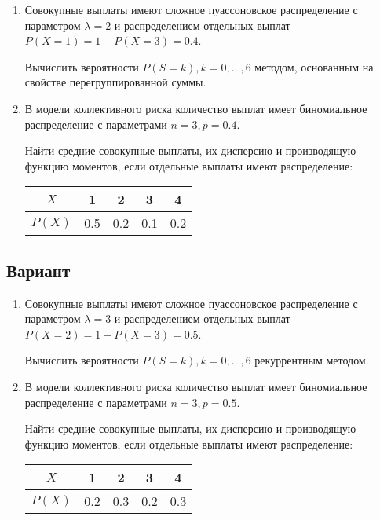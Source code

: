\documentclass[14pt, a4paper]{article}
\begin{document}
	\begin{enumerate}
		\item 
		Совокупные выплаты имеют сложное пуассоновское распределение с параметром $\lambda = 2$ и распределением отдельных выплат $P(X=1) = 1 - P(X=3) = 0.4$.
		
		Вычислить вероятности $P(S=k), k = 0, ..., 6$ методом, основанным на свойстве перегруппированной суммы.
		
		\item 
		В модели коллективного риска количество выплат имеет биномиальное распределение с параметрами $n=3, p=0.4$.
		
		Найти средние совокупные выплаты, их дисперсию и производящую функцию моментов, если отдельные выплаты имеют распределение:
		
		\begin{center}
			\begin{tabular}{ |c|c|c|c|c|}
				\hline
				$X$ & 1 & 2 & 3 & 4 \\
				\hline
				$P(X)$ & 0.5 & 0.2 & 0.1 & 0.2 \\
				\hline
			\end{tabular}
		\end{center}
	\end{enumerate}


	\newpage
	\begin{center}
		\section{Вариант}
	\end{center}
	
	\begin{enumerate}
		\item 
		Совокупные выплаты имеют сложное пуассоновское распределение с параметром $\lambda = 3$ и распределением отдельных выплат $P(X=2) = 1 - P(X=3) = 0.5$.
		
		Вычислить вероятности $P(S=k), k = 0, ..., 6$ рекуррентным методом.
		
		\item 
		В модели коллективного риска количество выплат имеет биномиальное распределение с параметрами $n=3, p=0.5$.
		
		Найти средние совокупные выплаты, их дисперсию и производящую функцию моментов, если отдельные выплаты имеют распределение:
		
		\begin{center}
			\begin{tabular}{ |c|c|c|c|c|}
				\hline
				$X$ & 1 & 2 & 3 & 4 \\
				\hline
				$P(X)$ & 0.2 & 0.3 & 0.2 & 0.3 \\
				\hline
			\end{tabular}
		\end{center}
	\end{enumerate}
\end{document}
